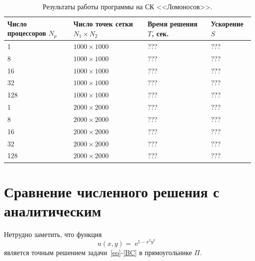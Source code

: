 \documentclass[11pt]{article}
\numberwithin{equation}{section}
\theoremstyle{plain}
\theoremstyle{definition}
\DeclareMathOperator{\expon}{e}
\begin{document}
\begin{table}[h]
\centering
\begin{tabular}{|l|l|l|l|}\hline
Число процессоров $N_p$ & Число точек сетки $N_1 \times N_2$ & Время решения $T$, сек. & Ускорение $S$ \\ \hline
1                       & $1000 \times 1000$                 & ???                     & ???           \\
8                       & $1000 \times 1000$                 & ???                     & ???           \\
16                      & $1000 \times 1000$                 & ???                     & ???           \\
32                      & $1000 \times 1000$                 & ???                     & ???           \\
128                     & $1000 \times 1000$                 & ???                     & ???           \\ \hline
1                       & $2000 \times 2000$                 & ???                     & ???           \\
8                       & $2000 \times 2000$                 & ???                     & ???           \\
16                      & $2000 \times 2000$                 & ???                     & ???           \\
32                      & $2000 \times 2000$                 & ???                     & ???           \\
128                     & $2000 \times 2000$                 & ???                     & ???           \\ \hline
\end{tabular}
    \caption{Результаты работы программы на СК <<Ломоносов>>.}
\label{tab_mpi}
\end{table}

\section{Сравнение численного решения с аналитическим}
Нетрудно заметить, что функция
\[u(x,y)=\expon^{1-x^2y^2}\]
является точным решением задачи~\eqref{eq}-\eqref{BC} в прямоугольнике \(\Pi.\)
\end{document}
